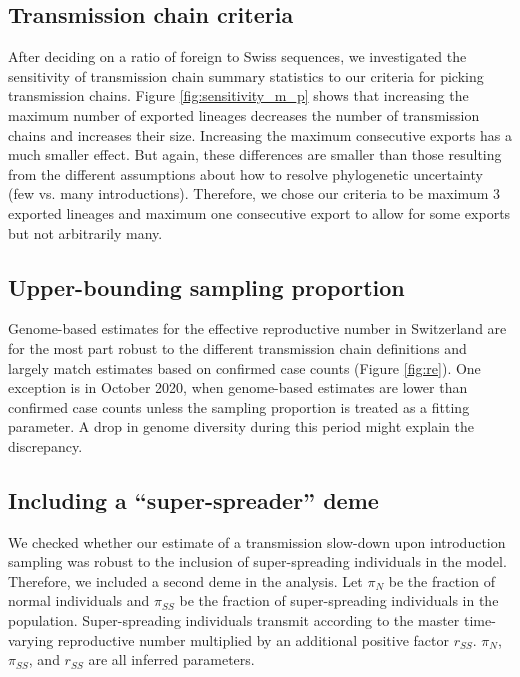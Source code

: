 \documentclass[9pt,twoside,lineno]{pnas-new}
\begin{document}
\subsection{Transmission chain criteria}
After deciding on a ratio of foreign to Swiss sequences, we investigated the sensitivity of transmission chain summary statistics to our criteria for picking transmission chains. Figure \ref{fig:sensitivity_m_p} shows that increasing the maximum number of exported lineages decreases the number of transmission chains and increases their size. Increasing the maximum consecutive exports has a much smaller effect. But again, these differences are smaller than those resulting from the different assumptions about how to resolve phylogenetic uncertainty (few vs. many introductions). Therefore, we chose our criteria to be maximum 3 exported lineages and maximum one consecutive export to allow for some exports but not arbitrarily many. 

\subsection{Upper-bounding sampling proportion}
Genome-based estimates for the effective reproductive number in Switzerland are for the most part robust to the different transmission chain definitions and largely match estimates based on confirmed case counts (Figure \ref{fig:re}). One exception is in October 2020, when genome-based estimates are lower than confirmed case counts unless the sampling proportion is treated as a fitting parameter. A drop in genome diversity during this period might explain the discrepancy. 

\subsection{Including a ``super-spreader'' deme}
We checked whether our estimate of a transmission slow-down upon introduction sampling was robust to the inclusion of super-spreading individuals in the model. Therefore, we included a second deme in the analysis. Let $\pi_N$ be the fraction of normal individuals and $\pi_{SS}$ be the fraction of super-spreading individuals in the population. Super-spreading individuals transmit according to the master time-varying reproductive number multiplied by an additional positive factor $r_{SS}$. $\pi_N$, $\pi_{SS}$, and $r_{SS}$ are all inferred parameters. 
\end{document}
